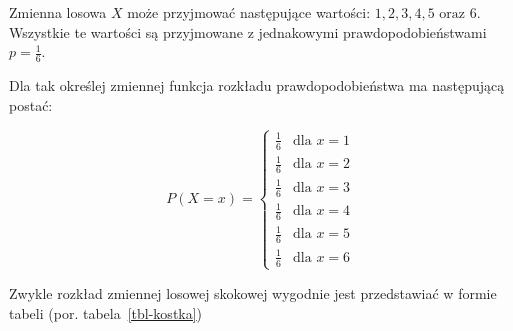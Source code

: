 \documentclass[
  letterpaper,
  DIV=11,
  numbers=noendperiod]{scrreprt}
\begin{document}
Zmienna losowa \(X\) może przyjmować następujące wartości:
\(1, 2, 3, 4, 5 \text{ oraz } 6\). Wszystkie te wartości są przyjmowane
z jednakowymi prawdopodobieństwami \(p=\frac{1}{6}\).

Dla tak określej zmiennej funkcja rozkładu prawdopodobieństwa ma
następującą postać:

\[P(X=x) = \begin{cases} 
\frac{1}{6} & \text{dla } x = 1 \\
\frac{1}{6} & \text{dla } x = 2 \\
\frac{1}{6} & \text{dla } x = 3 \\
\frac{1}{6} & \text{dla } x = 4 \\
\frac{1}{6} & \text{dla } x = 5 \\
\frac{1}{6} & \text{dla } x = 6
\end{cases}
\]

Zwykle rozkład zmiennej losowej skokowej wygodnie jest przedstawiać w
formie tabeli (por. tabela~\ref{tbl-kostka})
\end{document}
